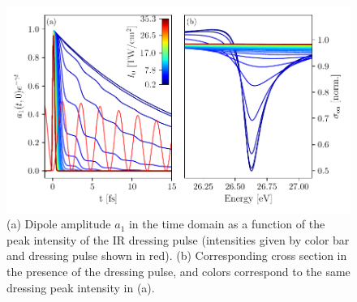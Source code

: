 \begin{figure}
	\centering
	\includegraphics[width=1.0\textwidth]{figures/ATS/a1_t.pdf}
	\caption[Dipole amplitude in time domain and absorption cross section calculated using DCM using LIA.]{(a) Dipole amplitude $a_1$ in the time domain as a function of the peak intensity of the IR dressing pulse (intensities given by color bar and dressing pulse shown in red). (b) Corresponding cross section in the presence of the dressing pulse, and colors correspond to the same dressing peak intensity in (a).}
	\label{fig:a1_t_intensity}
\end{figure}


